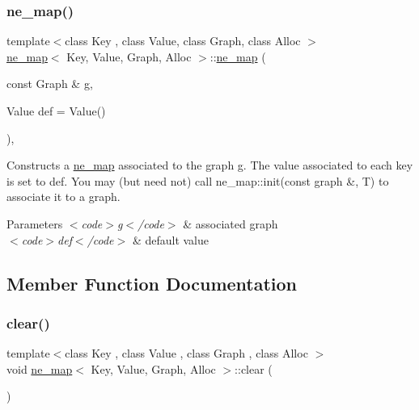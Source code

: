 \subsubsection{\texorpdfstring{ne\+\_\+map()}{ne\_map()}\hspace{0.1cm}{\footnotesize\ttfamily [2/2]}}
{\footnotesize\ttfamily template$<$class Key , class Value, class Graph, class Alloc $>$ \\
\mbox{\hyperlink{classne__map}{ne\+\_\+map}}$<$ Key, Value, Graph, Alloc $>$\+::\mbox{\hyperlink{classne__map}{ne\+\_\+map}} (\begin{DoxyParamCaption}\item[{const Graph \&}]{g,  }\item[{Value}]{def = {\ttfamily Value()} }\end{DoxyParamCaption})\hspace{0.3cm}{\ttfamily [explicit]}, {\ttfamily [protected]}}

Constructs a {\ttfamily \mbox{\hyperlink{classne__map}{ne\+\_\+map}}} associated to the {\ttfamily graph g}. The value associated to each key is set to {\ttfamily def}. You may (but need not) call {\ttfamily ne\+\_\+map\+::init(const graph \&, T)} to associate it to a {\ttfamily graph}.


\begin{DoxyParams}{Parameters}
{\em $<$code$>$g$<$/code$>$} & associated {\ttfamily graph} \\
\hline
{\em $<$code$>$def$<$/code$>$} & default value \\
\hline
\end{DoxyParams}


\subsection{Member Function Documentation}
\mbox{\label{classne__map_aebe555c23769c6dcc869b5ac7fae6a9c}} 
\subsubsection{\texorpdfstring{clear()}{clear()}}
{\footnotesize\ttfamily template$<$class Key , class Value , class Graph , class Alloc $>$ \\
void \mbox{\hyperlink{classne__map}{ne\+\_\+map}}$<$ Key, Value, Graph, Alloc $>$\+::clear (\begin{DoxyParamCaption}{ }\end{DoxyParamCaption})}


